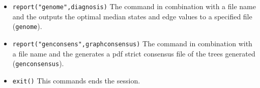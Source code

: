 \begin{itemize}
\item \texttt{report("genome",diagnosis)}  The  command in combination with a file name and the  outputs the optimal median states and edge values to a specified file (\texttt{genome}). 
\item \texttt{report("genconsens",graphconsensus)}  The  command in combination with a file name and the  generates a pdf strict consensus file of the trees generated (\texttt{genconsensus}). 
\item \texttt{exit()} This commands ends the \poy session.
\end{itemize}
